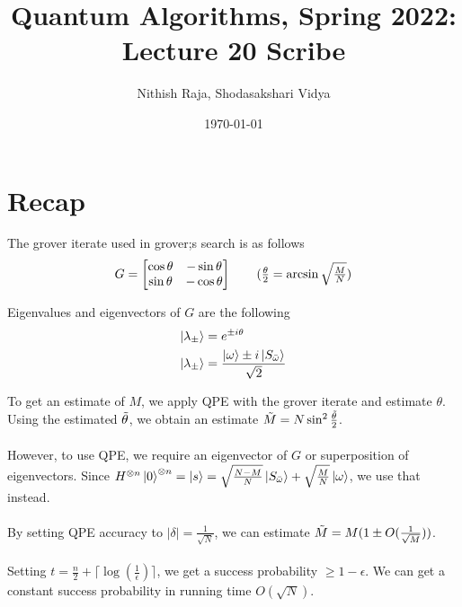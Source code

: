 \documentclass[11.5pt, paper=a4]{article}
\title{Quantum Algorithms, Spring 2022: Lecture 20 Scribe}
\author{Nithish Raja, Shodasakshari Vidya}
\date{\today}
\theoremstyle{definition}
\numberwithin{theorem}{section}
\begin{document}
\maketitle

\section{Recap}

\noindent The grover iterate used in grover;s search is as follows
\begin{equation*}
    G = \begin{bmatrix}
    \cos\theta & -\sin\theta\\
    \sin\theta & -\cos\theta\\
    \end{bmatrix} \tag{$\frac{\theta}{2} = \arcsin{\sqrt{\frac{M}{N}}}$}
\end{equation*}

\noindent Eigenvalues and eigenvectors of $G$ are the following
\begin{equation*}
\begin{split}
    \ket{\lambda_{\pm}} & = e^{\pm i\theta}\\
    \ket{\lambda_{\pm}} & = \frac{\ket{\omega}\pm i\ket{S_{\bar{\omega}}}}{\sqrt{2}}\\
\end{split}
\end{equation*}

\noindent To get an estimate of $M$, we apply QPE with the grover iterate and estimate $\theta$. Using the estimated $\Tilde{\theta}$, we obtain an estimate $\Tilde{M} = N\sin^2\frac{\Tilde{\theta}}{2}$.\\ \\
\noindent However, to use QPE, we require an eigenvector of $G$ or superposition of eigenvectors. Since $H^{\otimes n}\ket{0}^{\otimes n} = \ket{s} = \sqrt{\frac{N-M}{N}}\ket{S_{\bar{\omega}}} + \sqrt{\frac{M}{N}}\ket{\omega}$, we use that instead.\\ \\

\noindent By setting QPE accuracy to $|\delta| = \frac{1}{\sqrt{N}}$, we can estimate $\Tilde{M} = M(1\pm O(\frac{1}{\sqrt{M}}))$.\\ \\

\noindent Setting $t = \frac{n}{2} + \lceil\log(\frac{1}{\epsilon})\rceil$, we get a success probability $\ge 1 - \epsilon$. We can get a constant success probability in running time $O(\sqrt{N})$.
\end{document}
